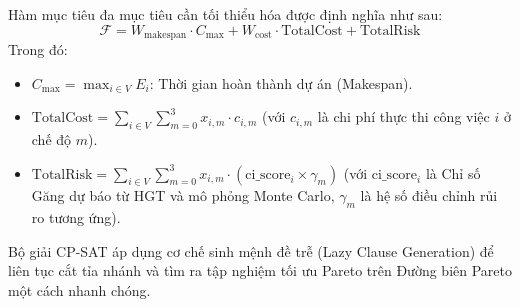 Hàm mục tiêu đa mục tiêu cần tối thiểu hóa được định nghĩa như sau:
\begin{equation}
    \mathcal{F} = W_{\text{makespan}} \cdot C_{\text{max}} + W_{\text{cost}} \cdot \text{TotalCost} + \text{TotalRisk}
\end{equation}
Trong đó:
\begin{itemize}
    \item $C_{\text{max}} = \max_{i \in V} E_i$: Thời gian hoàn thành dự án (Makespan).
    \item $\text{TotalCost} = \sum_{i \in V} \sum_{m=0}^{3} x_{i,m} \cdot c_{i,m}$ (với $c_{i,m}$ là chi phí thực thi công việc $i$ ở chế độ $m$).
    \item $\text{TotalRisk} = \sum_{i \in V} \sum_{m=0}^{3} x_{i,m} \cdot \left( \text{ci\_score}_i \times \gamma_m \right)$ (với $\text{ci\_score}_i$ là Chỉ số Găng dự báo từ HGT và mô phỏng Monte Carlo, $\gamma_m$ là hệ số điều chỉnh rủi ro tương ứng).
\end{itemize}
Bộ giải CP-SAT áp dụng cơ chế sinh mệnh đề trễ (Lazy Clause Generation) để liên tục cắt tỉa nhánh và tìm ra tập nghiệm tối ưu Pareto trên Đường biên Pareto một cách nhanh chóng.

